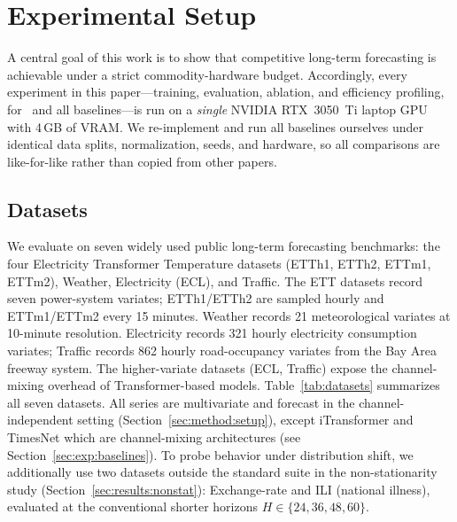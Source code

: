 \section{Experimental Setup}
\label{sec:experiments}

A central goal of this work is to show that competitive long-term forecasting is
achievable under a strict commodity-hardware budget. Accordingly, every
experiment in this paper---training, evaluation, ablation, and efficiency
profiling, for \method\ and all baselines---is run on a \emph{single} NVIDIA
RTX~3050~Ti laptop GPU with 4\,GB of VRAM. We re-implement and run all baselines
ourselves under identical data splits, normalization, seeds, and hardware, so
all comparisons are like-for-like rather than copied from other papers.

\subsection{Datasets}
\label{sec:exp:data}

We evaluate on seven widely used public long-term forecasting benchmarks: the
four Electricity Transformer Temperature datasets (ETTh1, ETTh2, ETTm1, ETTm2),
Weather, Electricity (ECL), and Traffic. The ETT datasets record seven
power-system variates; ETTh1/ETTh2 are sampled hourly and ETTm1/ETTm2 every
15 minutes. Weather records 21 meteorological variates at 10-minute resolution.
Electricity records 321 hourly electricity consumption variates; Traffic records
862 hourly road-occupancy variates from the Bay Area freeway system. The
higher-variate datasets (ECL, Traffic) expose the channel-mixing overhead of
Transformer-based models. Table~\ref{tab:datasets} summarizes all seven datasets.
All series are multivariate and forecast in the channel-independent setting
(Section~\ref{sec:method:setup}), except iTransformer and TimesNet which
are channel-mixing architectures (see Section~\ref{sec:exp:baselines}).
To probe behavior under distribution shift, we additionally use two datasets
outside the standard suite in the non-stationarity study
(Section~\ref{sec:results:nonstat}): Exchange-rate and ILI (national illness),
evaluated at the conventional shorter horizons $H \in \{24,36,48,60\}$.

